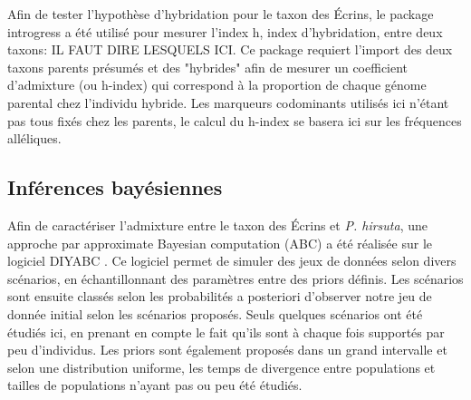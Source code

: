 Afin de tester l'hypothèse d'hybridation pour le taxon des Écrins, le package introgress \citep{Gompert2010} a été utilisé pour mesurer l'index h, index d'hybridation, entre deux taxons: IL FAUT DIRE LESQUELS ICI.
 Ce package requiert l'import des deux taxons parents présumés et des "hybrides" afin de mesurer un coefficient d'admixture (ou h-index) qui correspond à la proportion de chaque génome parental \citep{Buerkle2005} chez l'individu hybride.
 Les marqueurs codominants utilisés ici n'étant pas tous fixés chez les parents, le calcul du h-index se basera ici sur les fréquences alléliques.

\subsection{Inférences bayésiennes} 

Afin de caractériser l'admixture entre le taxon des Écrins et \textit{P. hirsuta}, une approche par approximate Bayesian computation (ABC) a été réalisée sur le logiciel DIYABC \citep{Cornuet2014}.
 Ce logiciel permet de simuler des jeux de données selon divers scénarios, en échantillonnant des paramètres entre des priors définis.
 Les scénarios sont ensuite classés selon les probabilités a posteriori d'observer notre jeu de donnée initial selon les scénarios proposés.
 Seuls quelques scénarios ont été étudiés ici, en prenant en compte le fait qu'ils sont à chaque fois supportés par peu d'individus. 
 Les priors sont également proposés dans un grand intervalle et selon une distribution uniforme, les temps de divergence entre populations et tailles de populations n'ayant pas ou peu été étudiés.

